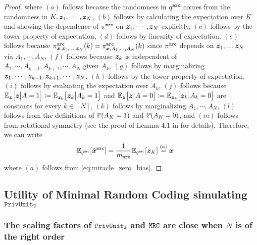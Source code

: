 \begin{proof}
where $(a)$ follows because the randomness in $q^{\texttt{mrc}}$ comes from the randomness in $K, {\boldsymbol{z}}_1, \cdots, {\boldsymbol{z}}_N$, $(b)$ follows by calculating the expectation over $K$ and showing the dependence of $\pi^{\texttt{mrc}}$ on ${\boldsymbol{z}}_1, \cdots, {\boldsymbol{z}}_N$ explicitly, $(c)$ follows by the tower property of expectation, $(d)$ follows by linearity of expectation, $(e)$ follows because $\pi^{\texttt{mrc}}_{{\boldsymbol{x}}, {\boldsymbol{z}}_1,...,{\boldsymbol{z}}_N}(k) = \pi^{\texttt{mrc}}_{{\boldsymbol{x}}, A_1,...,A_N}(k)$ since $\pi^{\texttt{mrc}}$ depends on ${\boldsymbol{z}}_1,...,{\boldsymbol{z}}_N$ via $A_1, \cdots,A_N$, $(f)$ follows because ${\boldsymbol{z}}_k$ is independent of $A_1, \cdots,A_{k-1}, A_{k+1}, \cdots,A_N$ given $A_k$, $(g)$ follows by marginalizing ${\boldsymbol{z}}_1, \cdots, {\boldsymbol{z}}_{k-1}, {\boldsymbol{z}}_{k+1}, \cdots, {\boldsymbol{z}}_N$, $(h)$ follows by the tower property of expectation, $(i)$ follows by evaluating the expectation over $A_k$, $(j)$ follows because $\mathbb{E}_{{\boldsymbol{z}}} \big[ {\boldsymbol{z}} \big| A = 1\big] \coloneqq \mathbb{E}_{{\boldsymbol{z}}_k} \big[ {\boldsymbol{z}}_k  \big| A_k = 1\big]$ and $\mathbb{E}_{{\boldsymbol{z}}} \big[ {\boldsymbol{z}} \big| A = 0\big] \coloneqq \mathbb{E}_{{\boldsymbol{z}}_k} \big[ {\boldsymbol{z}}_k  \big| A_k = 0\big]$ are constants for every $k \in [N]$, $(k)$ follows by marginalizing $A_1, \cdots, A_N$, $(l)$ follows from the definitions of $\mathbb{P}(A_K = 1)$ and $\mathbb{P}(A_K = 0)$, and $(m)$ follows from rotational symmetry (see the proof of Lemma 4.1 in \cite{BDFKR2018} for details). Therefore, we can write
\begin{align}
\mathbb{E}_{q^{\texttt{mrc}}} [\hat{{\boldsymbol{x}}}^\texttt{mrc}] & = \frac{1}{m_\texttt{mrc}} \mathbb{E}_{q^{\texttt{mrc}}} [{\boldsymbol{z}}_K ] \stackrel{(a)}{=} {\boldsymbol{x}}
\end{align}
where $(a)$ follows from \eqref{eq:miracle_zero_bias}.
\end{proof}


\subsection{Utility of Minimal Random Coding simulating \texorpdfstring{$\texttt{PrivUnit}_2$}{PrivUnit}}\label{appendix:mrc_pu_ut}

\subsubsection{The scaling factors of \texorpdfstring{$\texttt{PrivUnit}_2$}{PrivUnit} and \texorpdfstring{$\texttt{MRC}$}{MRC} are close when \texorpdfstring{$N$}{N} is of the right order}\label{appendix:scaling_mrc_pu}

